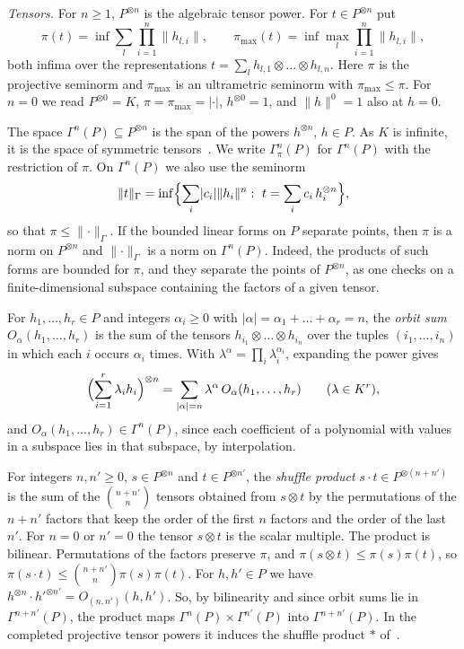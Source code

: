 \documentclass[11pt]{amsart}
\theoremstyle{definition}
\theoremstyle{remark}
\numberwithin{equation}{section}
\newcommand{\abs}[1]{\lvert #1\rvert}
\newcommand{\norm}[1]{\lVert #1\rVert}
\theoremstyle{plain}
\theoremstyle{definition}
\theoremstyle{plain}
\begin{document}
\emph{Tensors.} For $n\ge1$, $P^{\otimes n}$ is the algebraic tensor power. For $t\in P^{\otimes n}$ put
\[
 \pi(t)=\inf\sum_l\prod_{i=1}^n\norm{h_{l,i}},\qquad
 \pi_{\max}(t)=\inf\max_l\prod_{i=1}^n\norm{h_{l,i}},
\]
both infima over the representations $t=\sum_lh_{l,1}\otimes\dots\otimes h_{l,n}$. Here $\pi$ is the projective seminorm and $\pi_{\max}$ is an ultrametric seminorm with $\pi_{\max}\le\pi$. For $n=0$ we read $P^{\otimes0}=K$, $\pi=\pi_{\max}=\abs\cdot$, $h^{\otimes0}=1$, and $\norm h^0=1$ also at $h=0$.

The space $\Gamma^n(P)\subseteq P^{\otimes n}$ is the span of the powers $h^{\otimes n}$, $h\in P$. As $K$ is infinite, it is the space of symmetric tensors~\cite[Section~L.3, opening paragraph]{I}. We write $\Gamma^n_\pi(P)$ for $\Gamma^n(P)$ with the restriction of $\pi$. On $\Gamma^n(P)$ we also use the seminorm
\begin{equation}\label{dp:eq:gamma-norm}
 \norm t_\Gamma=\inf\Bigl\{\sum_i\abs{c_i}\norm{h_i}^n:\ t=\sum_ic_i\,h_i^{\otimes n}\Bigr\},
\end{equation}
so that $\pi\le\norm\cdot_\Gamma$. If the bounded linear forms on $P$ separate points, then $\pi$ is a norm on $P^{\otimes n}$ and $\norm\cdot_\Gamma$ is a norm on $\Gamma^n(P)$. Indeed, the products of such forms are bounded for $\pi$, and they separate the points of $P^{\otimes n}$, as one checks on a finite-dimensional subspace containing the factors of a given tensor.

For $h_1,\dots,h_r\in P$ and integers $\alpha_i\ge0$ with $\abs\alpha=\alpha_1+\dots+\alpha_r=n$, the \emph{orbit sum} $O_\alpha(h_1,\dots,h_r)$ is the sum of the tensors $h_{i_1}\otimes\dots\otimes h_{i_n}$ over the tuples $(i_1,\dots,i_n)$ in which each $i$ occurs $\alpha_i$ times. With $\lambda^\alpha=\prod_i\lambda_i^{\alpha_i}$, expanding the power gives~\cite[(14.1)]{I}
\begin{equation}\label{dp:eq:orbit}
 \Bigl(\sum_{i=1}^r\lambda_ih_i\Bigr)^{\otimes n}=\sum_{\abs\alpha=n}\lambda^\alpha\,O_\alpha(h_1,\dots,h_r)\qquad(\lambda\in K^r),
\end{equation}
and $O_\alpha(h_1,\dots,h_r)\in\Gamma^n(P)$, since each coefficient of a polynomial with values in a subspace lies in that subspace, by interpolation.

For integers $n,n'\ge0$, $s\in P^{\otimes n}$ and $t\in P^{\otimes n'}$, the \emph{shuffle product} $s\cdot t\in P^{\otimes(n+n')}$ is the sum of the $\binom{n+n'}n$ tensors obtained from $s\otimes t$ by the permutations of the $n+n'$ factors that keep the order of the first $n$ factors and the order of the last $n'$. For $n=0$ or $n'=0$ the tensor $s\otimes t$ is the scalar multiple. The product is bilinear. Permutations of the factors preserve $\pi$, and $\pi(s\otimes t)\le\pi(s)\pi(t)$, so $\pi(s\cdot t)\le\binom{n+n'}n\pi(s)\pi(t)$. For $h,h'\in P$ we have $h^{\otimes n}\cdot h'^{\otimes n'}=O_{(n,n')}(h,h')$. So, by bilinearity and since orbit sums lie in $\Gamma^{n+n'}(P)$, the product maps $\Gamma^n(P)\times\Gamma^{n'}(P)$ into $\Gamma^{n+n'}(P)$. In the completed projective tensor powers it induces the shuffle product $*$ of~\cite[Section~L.3]{I}.
\end{document}
